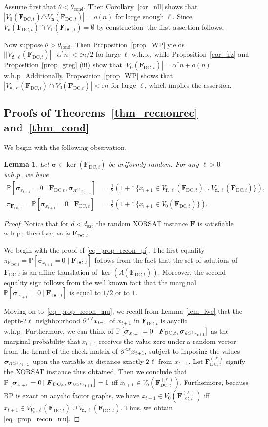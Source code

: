 \documentclass[10pt,reqno]{amsart}
\numberwithin{equation}{section}
\renewcommand{\vec}[1]{\boldsymbol{#1}}
\newcommand\dsat{d_{\mathrm{sat}}}
\newcommand{\FDC}[1]{\PHI_{\mathrm{DC},{#1}}}
\newcommand{\tcond}{\theta_{\mathrm{cond}}}
\newcommand{\frz}{V_0}
\newcommand{\frozen}{\mathtt{f}}
\newcommand{\unfrozen}{\mathtt{u}}
\newcommand{\nll}{\mathtt{n}}
\newcommand{\fzn}{\frozen}
\newcommand{\uzn}{\unfrozen}
\newcommand\PHI{\vec F}
\newcommand\SIGMA{\vec\sigma}
\newcommand\eps{\varepsilon}
\newcommand{\vecone}{\mathbb{1}}
\newcommand\bc[1]{\left({#1}\right)}
\newcommand\brk[1]{\left\lbrack{#1}\right\rbrack}
\newcommand{\whp}{w.h.p.}
\newcommand\pr{\mathbb{P}}
\newcommand\Lem{Lemma}
\newcommand\Prop{Proposition}
\newcommand\Thm{Theorem}
\newcommand\Cor{Corollary}
\newtheorem{lemma}[definition]{Lemma}
\def\pr{{\mathbb P}}
\begin{document}
Assume first that $\theta<\tcond$.
Then \Cor~\ref{cor_nll} shows that $|\frz(\FDC t)\triangle V_{\nll}(\FDC t)|=o(n)$ for large enough $\ell$.
Since $V_{\nll}(\FDC t)\cap V_{\fzn}(\FDC t)=\emptyset$ by construction, the first assertion follows. 

Now suppose $\theta>\tcond$.
Then \Prop~\ref{prop_WP} yields $||V_{\fzn,\ell}(\FDC t)|-\alpha^*n|<\eps n/2$ for large $\ell$ \whp, while \Prop~\ref{cor_frz} and \Prop~\ref{prop_greg} (iii) show that $|\frz(\FDC t)|=\alpha^*n+o(n)$ \whp\
Additionally, \Prop~\ref{prop_WP} shows that $|V_{\uzn,\ell}(\FDC t)\cap \frz(\FDC t)|<\eps n$ for large $\ell$, which implies the assertion.
	
\subsection{Proofs of \Thm s~\ref{thm_recnonrec} and~\ref{thm_cond}}\label{sec_thm_recnonrec}
We begin with the following observation.

\begin{lemma}\label{prop_recon}
	Let $\SIGMA\in\ker(\FDC t)$ be uniformly random.
	For any $\ell>0$ \whp\ we have
	\begin{align}\label{eq_prop_recon_mu}
		\pr\brk{\SIGMA_{x_{t+1}}=0\mid\FDC t,\SIGMA_{\partial^{2\ell} x_{t+1}}}&=\frac12\bc{1+\vecone\{x_{t+1}\in V_{\fzn,\ell}(\FDC t)\cup V_{\nll,\ell}(\FDC t)\}},\\
		\pi_{\FDC{t}}=\pr\brk{\SIGMA_{x_{t+1}}=0\mid\FDC t}&=\frac12\bc{1+\vecone\{x_{t+1}\in \frz(\FDC t)\}}.\label{eq_prop_recon_pi}
	\end{align}
\end{lemma}
\begin{proof}
	Notice that for $d<\dsat$ the random XORSAT instance $\PHI$ is satisfiable \whp; therefore, so is $\FDC t$.

	We begin with the proof of \eqref{eq_prop_recon_pi}.
	The first equality $\pi_{\FDC{t}}=\pr\brk{\SIGMA_{x_{t+1}}=0\mid\FDC t}$ follows from the fact that the set of solutions of $\FDC t$ is an affine translation of $\ker(A(\FDC t))$.
	Moreover, the second equality sign follows from the well known fact that the marginal $\pr\brk{\SIGMA_{x_{t+1}}=0\mid\FDC t}$ is equal to $1/2$ or to $1$.

	Moving on to~\eqref{eq_prop_recon_mu}, we recall from \Lem~\ref{lem_lwc} that the depth-$2\ell$ neighbourhood $\partial^{\leq\ell} x_{t+1}$ of $x_{t+1}$ in $\FDC t$ is acyclic \whp\
	Furthermore, we can think of $\pr\brk{\SIGMA_{x_{t+1}}=0\mid\FDC t,\SIGMA_{\nb x_{t+1}}}$ as the marginal probability that $x_{t+1}$ receives the value zero under a random vector from the kernel of the check matrix of $\partial^{\leq\ell} x_{t+1}$, subject to imposing the values $\SIGMA_{\nb x_{t+1}}$ upon the variable at distance exactly $2\ell$ from $x_{t+1}$.
	Let $\FDC t^{(\ell)}$ signify the XORSAT instance thus obtained.
	Then we conclude that $\pr\brk{\SIGMA_{x_{t+1}}=0\mid\FDC t,\SIGMA_{\nb x_{t+1}}}=1$ iff $x_{t+1}\in V_0(\FDC t^{(\ell)})$.
	Furthermore, because BP is exact on acyclic factor graphs, we have $x_{t+1}\in V_0(\FDC t^{(\ell)})$ iff $x_{t+1}\in V_{\frz,\ell}(\FDC t)\cup V_{\nll,\ell}(\FDC t)$.
	Thus, we obtain \eqref{eq_prop_recon_mu}.
\end{proof}
\end{document}
